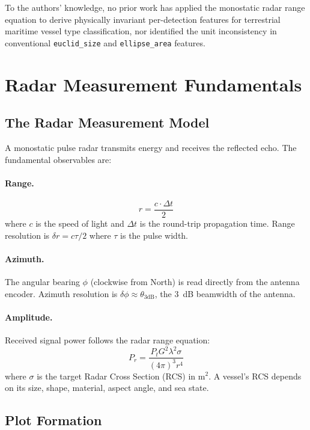 \documentclass[journal]{IEEEtran}
\begin{document}
To the authors' knowledge, no prior work has applied the monostatic radar range equation to derive physically invariant per-detection features for terrestrial maritime vessel type classification, nor identified the unit inconsistency in conventional \texttt{euclid\_size} and \texttt{ellipse\_area} features.

\section{Radar Measurement Fundamentals}

\subsection{The Radar Measurement Model}

A monostatic pulse radar transmits energy and receives the reflected echo.
The fundamental observables are:

\paragraph{Range.}
\begin{equation}
  r = \frac{c \cdot \Delta t}{2}
\end{equation}
where $c$ is the speed of light and $\Delta t$ is the round-trip propagation time.
Range resolution is $\delta r = c\tau/2$ where $\tau$ is the pulse width.

\paragraph{Azimuth.}
The angular bearing $\phi$ (clockwise from North) is read directly from the
antenna encoder. Azimuth resolution is $\delta\phi \approx \theta_{3\text{dB}}$,
the 3~dB beamwidth of the antenna.

\paragraph{Amplitude.}
Received signal power follows the radar range equation:
\begin{equation}
  P_r = \frac{P_t G^2 \lambda^2 \sigma}{(4\pi)^3 r^4}
  \label{eq:range_eq}
\end{equation}
where $\sigma$ is the target Radar Cross Section (RCS) in m$^2$.
A vessel's RCS depends on its size, shape, material, aspect angle, and sea state.

\subsection{Plot Formation}
\end{document}
